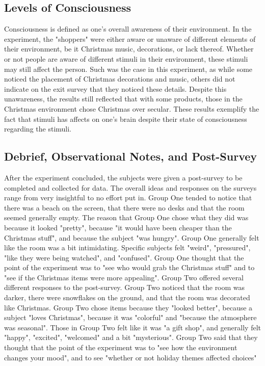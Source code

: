 \documentclass[twoside]{article}
\begin{document}
\begin{multicols}{2}
\subsection{Levels of Consciousness}

Consciousness is defined as one's overall awareness of their environment. In the experiment, the "shoppers" were either aware or unaware of different elements of their environment, be it Christmas music, decorations, or lack thereof. Whether 
or
not people are aware of different stimuli in their environment, these stimuli may still affect the person. Such was the case in this experiment, as while some noticed the placement of Christmas decorations and music, others 
did
not indicate on the exit survey that they noticed these details. Despite this unawareness, the results still reflected that with some products, those in the Christmas environment chose Christmas over secular. These results exemplify the fact that stimuli has affects on one's brain despite their state of consciousness regarding the stimuli.

\subsection{Debrief, Observational Notes, and Post-Survey}
After the experiment concluded, the subjects were given a post-survey to be completed and collected for data. The overall ideas and responses on the surveys range from very insightful to no effort put in. Group One tended to notice that there was a beach on the screen, that there were no desks and that the room seemed generally empty. The reason that Group One chose what they did was because it looked "pretty", because "it would have been cheaper than the Christmas stuff", and because the subject "was hungry". Group One generally felt like the room was a bit intimidating. Specific subjects felt "weird", "pressured", "like they were being watched", and "confused". Group One thought that the point of the experiment was to "see who would grab the Christmas stuff" and to "see if the Christmas items were more appealing". Group Two offered several different responses to the post-survey. Group Two noticed that the room was darker, there were snowflakes on the ground, and that the room was decorated like Christmas. Group Two chose items because they "looked better", because a subject "loves Christmas", because it was "colorful" and "because the atmosphere was seasonal". Those in Group Two felt like it was "a gift shop", and generally felt "happy", "excited", "welcomed" and a bit "mysterious". Group Two said that they thought that the point of the experiment was to "see how the environment changes your mood", 
and to see
"whether or not holiday themes affected choices"


\end{multicols}
\end{document}
